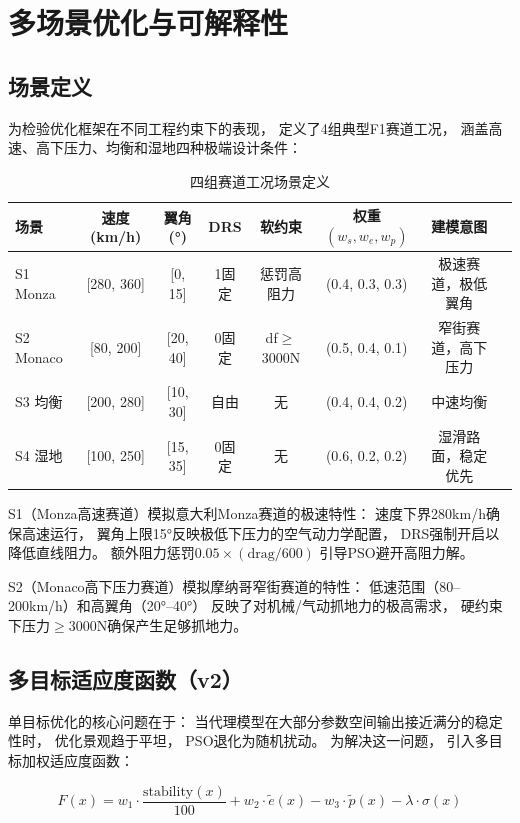 \section{多场景优化与可解释性}

\subsection{场景定义}

为检验优化框架在不同工程约束下的表现，
定义了4组典型F1赛道工况，
涵盖高速、高下压力、均衡和湿地四种极端设计条件：

\begin{table}[H]
\centering
\caption{四组赛道工况场景定义}
\begin{tabular}{lccccccl}
\toprule
场景 & 速度 (km/h) & 翼角 (°) & DRS & 软约束 & 权重$(w_s, w_e, w_p)$ & 建模意图 \\
\midrule
S1 Monza & [280, 360] & [0, 15] & 1固定 & 惩罚高阻力 & (0.4, 0.3, 0.3) & 极速赛道，极低翼角 \\
S2 Monaco & [80, 200] & [20, 40] & 0固定 & df$\geq$3000N & (0.5, 0.4, 0.1) & 窄街赛道，高下压力 \\
S3 均衡 & [200, 280] & [10, 30] & 自由 & 无 & (0.4, 0.4, 0.2) & 中速均衡 \\
S4 湿地 & [100, 250] & [15, 35] & 0固定 & 无 & (0.6, 0.2, 0.2) & 湿滑路面，稳定优先 \\
\bottomrule
\end{tabular}
\end{table}

S1（Monza高速赛道）模拟意大利Monza赛道的极速特性：
速度下界280km/h确保高速运行，
翼角上限15°反映极低下压力的空气动力学配置，
DRS强制开启以降低直线阻力。
额外阻力惩罚$0.05 \times (\text{drag}/600)$
引导PSO避开高阻力解。

S2（Monaco高下压力赛道）模拟摩纳哥窄街赛道的特性：
低速范围（80--200km/h）和高翼角（20°--40°）
反映了对机械/气动抓地力的极高需求，
硬约束下压力$\geq 3000$N确保产生足够抓地力。

\subsection{多目标适应度函数（v2）}

单目标优化的核心问题在于：
当代理模型在大部分参数空间输出接近满分的稳定性时，
优化景观趋于平坦，
PSO退化为随机扰动。
为解决这一问题，
引入多目标加权适应度函数：

\begin{equation}
    F(x) = w_1 \cdot \frac{\text{stability}(x)}{100}
         + w_2 \cdot \tilde{e}(x)
         - w_3 \cdot \tilde{p}(x)
         - \lambda \cdot \sigma(x)
    \label{eq:multiobj}
\end{equation}

